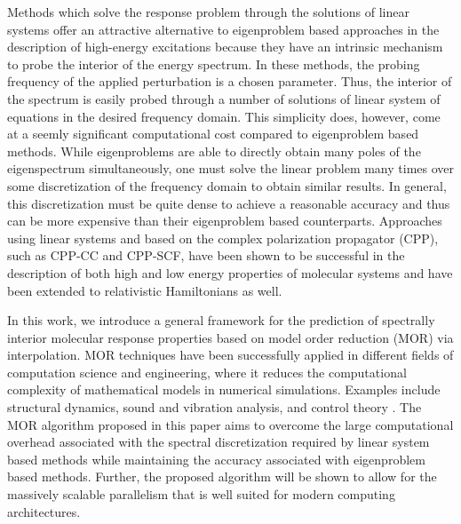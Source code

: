 Methods which solve the response problem through the solutions of linear systems offer an attractive alternative to eigenproblem based approaches in the description of high-energy excitations because they have an intrinsic
mechanism to probe the interior of the energy spectrum. In these methods, the
probing frequency of the applied perturbation is a chosen parameter.\cite{Hattig98_1,Ruud12_543} Thus,
the interior of the spectrum is easily probed through a number of solutions
of linear system of equations in the desired frequency domain. This simplicity 
does, however, come at a seemly significant computational cost compared to eigenproblem based methods.
While eigenproblems are able to directly obtain many poles of the eigenspectrum
simultaneously, one must solve the linear problem many times
over some discretization of the frequency domain to obtain similar results.
In general, this discretization must be quite dense to achieve a reasonable 
accuracy and thus can be more expensive than their eigenproblem based counterparts. Approaches using linear systems and based on the complex
polarization propagator (CPP), such as CPP-CC\cite{Norman12_1616,Norman13_124311,Coriani13_211102} and CPP-SCF,\cite{Rubio_Book,Ruud12_543,Yeager84_33,Oddershede01_JCP}
have been shown to be successful in the description of both high\cite{Norman16_1991,Norman12_022507,Norman10_5096,Agren06_143001,Norman16_13591} and low\cite{Mathieu15_21866} energy properties of molecular systems and have been extended to relativistic Hamiltonians as well\cite{Norman10_064105}.

In this work, we introduce a general framework for the prediction of spectrally interior molecular response properties based on model order reduction (MOR) via interpolation. MOR techniques have been successfully applied in different fields of computation science and engineering, where it reduces the computational complexity of mathematical models in numerical simulations. Examples include structural dynamics, sound and vibration analysis, and control theory \cite{Antoulas2005}. The MOR algorithm proposed in this paper aims to overcome the large computational overhead associated with the spectral discretization required by linear system based methods while maintaining the accuracy associated with eigenproblem based methods. Further, the proposed algorithm will be shown to allow for the massively scalable parallelism that is well suited for modern computing architectures.

